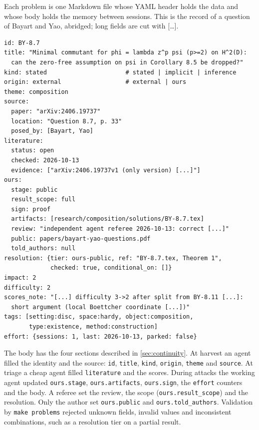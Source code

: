 \documentclass[11pt]{amsart}
\newcommand*{\sectionbreak}{\clearpage} %
\begin{document}
Each problem is one Markdown file whose YAML header holds the data and whose
body holds the memory between sessions. This is the record of a question of
Bayart and Yao, abridged; long fields are cut with [\dots].
\begin{verbatim}
id: BY-8.7
title: "Minimal commutant for phi = lambda z^p psi (p>=2) on H^2(D):
  can the zero-free assumption on psi in Corollary 8.5 be dropped?"
kind: stated                      # stated | implicit | inference
origin: external                  # external | ours
theme: composition
source:
  paper: "arXiv:2406.19737"
  location: "Question 8.7, p. 33"
  posed_by: [Bayart, Yao]
literature:
  status: open
  checked: 2026-10-13
  evidence: ["arXiv:2406.19737v1 (only version) [...]"]
ours:
  stage: public
  result_scope: full
  sign: proof
  artifacts: [research/composition/solutions/BY-8.7.tex]
  review: "independent agent referee 2026-10-13: correct [...]"
  public: papers/bayart-yao-questions.pdf
  told_authors: null
resolution: {tier: ours-public, ref: "BY-8.7.tex, Theorem 1",
             checked: true, conditional_on: []}
impact: 2
difficulty: 2
scores_note: "[...] difficulty 3->2 after split from BY-8.11 [...]:
  short argument (local Boettcher coordinate [...])"
tags: [setting:disc, space:hardy, object:composition,
       type:existence, method:construction]
effort: {sessions: 1, last: 2026-10-13, parked: false}
\end{verbatim}
The body has the four sections described in \cref{sec:continuity}. At harvest
an agent filled the identity and the source: \texttt{id}, \texttt{title},
\texttt{kind}, \texttt{origin}, \texttt{theme} and \texttt{source}. At triage a
cheap agent filled \texttt{literature} and the scores. During attacks the
working agent updated \texttt{ours.stage}, \texttt{ours.artifacts},
\texttt{ours.sign}, the \texttt{effort} counters and the body. A referee set
the review, the scope (\texttt{ours.result\_scope}) and the resolution. Only
the author set \texttt{ours.public} and \texttt{ours.told\_authors}. Validation
by \texttt{make problems} rejected unknown fields, invalid values and
inconsistent combinations, such as a resolution tier on a partial result.

\sectionbreak
\end{document}
